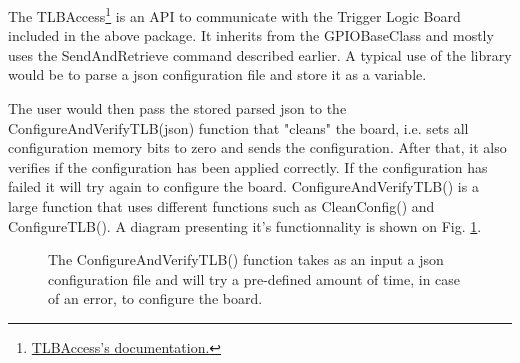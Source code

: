 The TLBAccess\footnote{\href{https://faserdaq.web.cern.ch/faserdaq/gpiodrivers/doc/html/class_f_a_s_e_r_1_1_t_l_b_access.html\#ada95a891d48b8d907e49e51ec3a6d5de}{TLBAccess's documentation.}} is an API to communicate with the Trigger Logic Board included in the above package. It inherits from the GPIOBaseClass and mostly uses the SendAndRetrieve command described earlier. A typical use of the library would be to parse a json configuration file and store it as a variable.



The user would then pass the stored parsed json to the ConfigureAndVerifyTLB(json) function that "cleans" the board, i.e. sets all configuration memory bits to zero and sends the configuration. After that, it also verifies if the configuration has been applied correctly. If the configuration has failed it will try again to configure the board. ConfigureAndVerifyTLB() is a large function that uses different functions such as CleanConfig() and ConfigureTLB(). A diagram presenting it's functionnality is shown on Fig. \ref{fig:ConfigureAndVerifyTLB()}.

\begin{figure}[htbp!]
    \centering
    \caption{The ConfigureAndVerifyTLB() function takes as an input a json configuration file and  will try a pre-defined amount of time, in case of an error, to configure the board.}
    \label{fig:ConfigureAndVerifyTLB()}
\end{figure}


